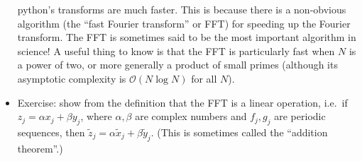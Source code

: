 \documentclass[aps,prd,superscriptaddress,groupedaddress,nofootinbib,nobibnotes]{revtex4}
\def\bigoh{{\mathcal O}}
\begin{document}
\begin{itemize}
 python's transforms are much faster.  This is because there is a non-obvious algorithm (the ``fast Fourier
 transform'' or FFT) for speeding up the Fourier transform.  The FFT is sometimes said to be the most important
 algorithm in science!  A useful thing to know is that the FFT is particularly fast when $N$ is a power of two,
 or more generally a product of small primes (although its asymptotic complexity is $\bigoh(N \log N)$ for all $N$).
\item Exercise: show from the definition that the FFT is a linear operation, i.e.~if $z_j = \alpha x_j + \beta y_j$,
 where $\alpha,\beta$ are complex numbers and $f_j,g_j$ are periodic sequences, then 
 $\tilde z_j = \alpha \tilde x_j + \beta \tilde y_j$.  (This is sometimes called the ``addition theorem''.)
\end{itemize}



%

% 
% 

\end{document}
